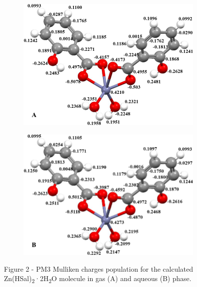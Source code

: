 \begin{figure}[H]
    \centering
    \begin{subfigure}[b]{0.45\textwidth}
        \centering
        \includegraphics[width=\textwidth]{assets/39}
    \end{subfigure}
    \hfill
    \begin{subfigure}[b]{0.45\textwidth}
        \centering
        \includegraphics[width=\textwidth]{assets/40}
    \end{subfigure}
    \caption*{Figure 2 - PM3 Mulliken charges population for the calculated Zn(HSal)\textsubscript{2}·2H\textsubscript{2}O molecule in gas (A) and aqueous (B) phase.}
\end{figure}

